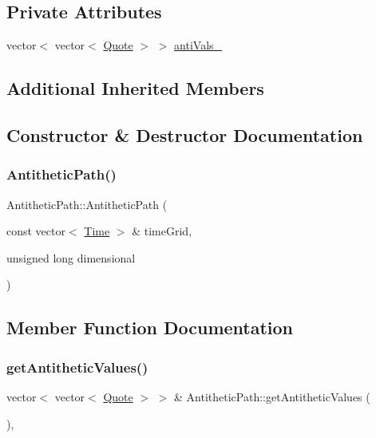 \subsection*{Private Attributes}
\begin{DoxyCompactItemize}
\item 
vector$<$ vector$<$ \hyperlink{_name_def_8h_a642a6c5fd87319d922637de0e0bb0305}{Quote} $>$ $>$ \hyperlink{class_antithetic_path_a4aae58299bbbd6516c71fc837bcfe3e7}{anti\+Vals\+\_\+}
\end{DoxyCompactItemize}
\subsection*{Additional Inherited Members}


\subsection{Constructor \& Destructor Documentation}
\hypertarget{class_antithetic_path_a3064f50d9c097f15a0472c94871911cc}{}\label{class_antithetic_path_a3064f50d9c097f15a0472c94871911cc} 
\subsubsection{\texorpdfstring{Antithetic\+Path()}{AntitheticPath()}}
{\footnotesize\ttfamily Antithetic\+Path\+::\+Antithetic\+Path (\begin{DoxyParamCaption}\item[{const vector$<$ \hyperlink{_name_def_8h_ac2d3e0ba793497bcca555c7c2cf64ff3}{Time} $>$ \&}]{time\+Grid,  }\item[{unsigned long}]{dimensional }\end{DoxyParamCaption})}



\subsection{Member Function Documentation}
\hypertarget{class_antithetic_path_a7f94c2a66c0d16ebedba930fbca9d859}{}\label{class_antithetic_path_a7f94c2a66c0d16ebedba930fbca9d859} 
\subsubsection{\texorpdfstring{get\+Antithetic\+Values()}{getAntitheticValues()}\hspace{0.1cm}{\footnotesize\ttfamily [1/2]}}
{\footnotesize\ttfamily vector$<$ vector$<$ \hyperlink{_name_def_8h_a642a6c5fd87319d922637de0e0bb0305}{Quote} $>$ $>$ \& Antithetic\+Path\+::get\+Antithetic\+Values (\begin{DoxyParamCaption}{ }\end{DoxyParamCaption})\hspace{0.3cm}{\ttfamily [override]}, {\ttfamily [virtual]}}



